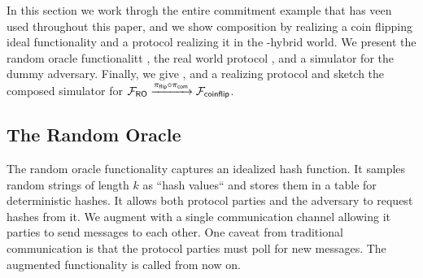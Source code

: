 In this section we work throgh the entire commitment example that has veen used throughout this paper, and we show composition by realizing a coin flipping ideal functionality \Fflip and a protocol realizing it in the \Fcom-hybrid world.
We present the random oracle functionalitt \Fro, the real world protocol , and a simulator for the dummy adversary.
Finally, we give \Fflip, and a realizing protocol and sketch the composed simulator for $\mathcal{F}_{{\mathsf {RO}}} \xrightarrow{\pi_{{\mathsf {flip}}} \circ \pi_{{\mathsf {com}}}} \mathcal{F}_{{\mathsf {coinflip}}}$.

%

\subsection{The Random Oracle}
The random oracle functionality captures an idealized hash function. It samples random strings of length $k$ as ``hash values`` and stores them in a table for deterministic hashes.
It allows both protocol parties and the adversary to request hashes from it.
We augment \Fro with a single communication channel allowing it parties to send messages to each other. One caveat from traditional communication
is that the protocol parties must poll \Fro for new messages. The augmented functionality is called \Fropp from now on.

